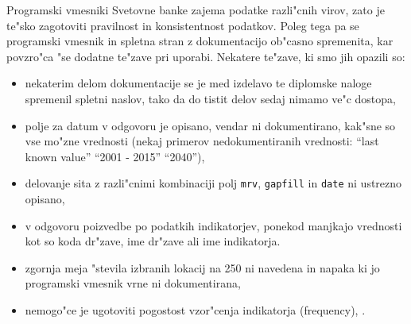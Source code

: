 Programski vmesniki Svetovne banke zajema podatke razli"cnih virov, zato je
te"sko zagotoviti pravilnost in konsistentnost podatkov. Poleg tega pa se 
programski vmesnik in spletna stran z dokumentacijo ob"casno spremenita, kar
povzro"ca "se dodatne te"zave pri uporabi. Nekatere te"zave, ki smo jih opazili
so:
\begin{itemize}  
\item nekaterim delom dokumentacije se je med izdelavo te diplomske naloge
  spremenil spletni naslov, tako da do tistit delov sedaj nimamo ve"c dostopa,
\item polje za datum v odgovoru je opisano, vendar ni dokumentirano, kak"sne so
    vse mo"zne vrednosti (nekaj primerov nedokumentiranih vrednosti:
    ``last known value'' ``2001 - 2015'' ``2040''),
\item delovanje sita z razli"cnimi kombinaciji polj \verb|mrv|, \verb|gapfill|
  in \verb|date| ni ustrezno opisano,
\item v odgovoru poizvedbe po podatkih indikatorjev, ponekod manjkajo vrednosti
  kot so koda dr"zave, ime dr"zave ali ime indikatorja.
\item zgornja meja "stevila izbranih lokacij na 250 ni navedena in napaka 
  ki jo programski vmesnik vrne ni dokumentirana,
\item nemogo"ce je ugotoviti pogostost vzor"cenja indikatorja (frequency), .
\end{itemize}  







